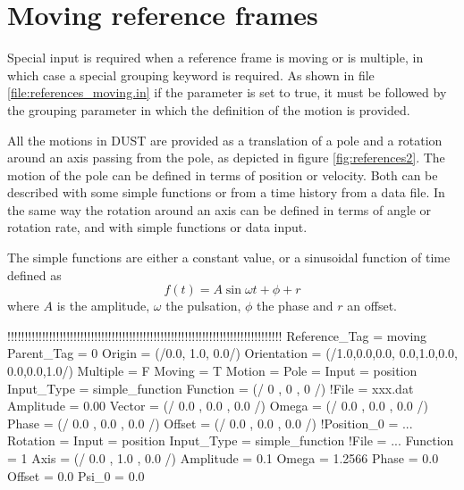 \section{Moving reference frames}
Special input is required when a reference frame is moving or is multiple, in which case a special grouping keyword is required. As shown in file \ref{file:references_moving.in} if the parameter  is set to true, it must be followed by the grouping parameter  in which the definition of the motion is provided. 

All the motions in DUST are provided as a translation of a pole and a rotation around an axis passing from the pole, as depicted in figure \ref{fig:references2}. The motion of the pole can be defined in terms of position or velocity. Both can be described with some simple functions or from a time history from a data file.
In the same way the rotation around an axis can be defined in terms of angle or rotation rate, and with simple functions or data input.

The simple functions are either a constant value, or a sinusoidal function of time defined as
\begin{equation}
f(t) = A \sin{\omega t + \phi} + r 
\end{equation}
where $A$ is the amplitude, $\omega$ the pulsation, $\phi$ the phase and $r$ an offset. 

\begin{inputfile}[frame=single, caption={references\_moving.in}, label={file:references_moving.in}]
!!!!!!!!!!!!!!!!!!!!!!!!!!!!!!!!!!!!!!!!!!!!!!!!!!!!!!!!!!!!!!!!!!!!!!!!!!!!!!!
Reference_Tag = moving
Parent_Tag = 0
Origin = (/0.0, 1.0, 0.0/)
Orientation = (/1.0,0.0,0.0, 0.0,1.0,0.0, 0.0,0.0,1.0/)
Multiple = F
Moving = T
Motion = {
  Pole = {
    Input      = position                           
    Input_Type = simple_function
    Function   = (/  0  ,  0  ,  0  /)
    !File       = xxx.dat
    Amplitude  = 0.00
    Vector     = (/ 0.0 , 0.0 , 0.0 /)
    Omega      = (/ 0.0 , 0.0 , 0.0 /)
    Phase      = (/ 0.0 , 0.0 , 0.0 /)
    Offset     = (/ 0.0 , 0.0 , 0.0 /)
    !Position_0 = ...
  }
  Rotation   = {
    Input      = position
    Input_Type = simple_function
    !File = ...
    Function   =  1      
    Axis       = (/ 0.0 , 1.0 , 0.0 /)  
    Amplitude  = 0.1    
    Omega      = 1.2566  
    Phase      = 0.0  
    Offset     = 0.0  
    Psi_0      = 0.0           
  }
}
\end{inputfile}

